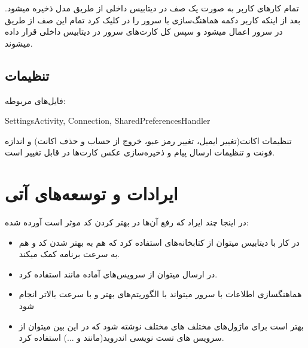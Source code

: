 \documentclass[11pt]{article}
\begin{document}
تمام کار‌های کاربر به صورت یک صف در دیتابیس داخلی از طریق مدل  ذخیره میشود. بعد از اینکه کاربر دکمه هماهنگ‌سازی با سرور را در  کلیک کرد تمام این صف از طریق  در سرور اعمال میشود و سپس کل کارت‌های سرور در دیتابیس داخلی قرار داده میشوند.

\subsection{تنظیمات}


فایل‌های مربوطه:\\
\begin{latin}
SettingsActivity, Connection, SharedPreferencesHandler\\
\end{latin}

تنظیمات اکانت(تغییر ایمیل، تغییر رمز عبو، خروج از حساب و حذف اکانت) و اندازه فونت و تنظیمات ارسال پیام و ذخیره‌سازی عکس کار‌ت‌ها در  قابل تغییر است.

\section{ایرادات و توسعه‌های آتی}
در اینجا چند ایراد که رفع آن‌ها در بهتر کردن کد موثر است آورده شده:
\begin{itemize}
\item در کار با دیتابیس میتوان از کتابخانه‌های  استفاده کرد که هم به بهتر شدن کد و هم به سرعت برنامه کمک میکند.
\item در ارسال  میتوان از سرویس‌های آماده مانند  استفاده کرد.
\item هماهنگسازی اطلاعات با سرور میتواند با الگوریتم‌های بهتر و  با سرعت بالاتر انجام شود
\item بهتر است برای ماژو‌‌ل‌های مختلف  های مختلف نوشته شود که در این بین میتوان از سرویس ‌های تست نویسی اندروید(مانند  و ...) استفاده کرد.
\end{itemize}
\end{document}
